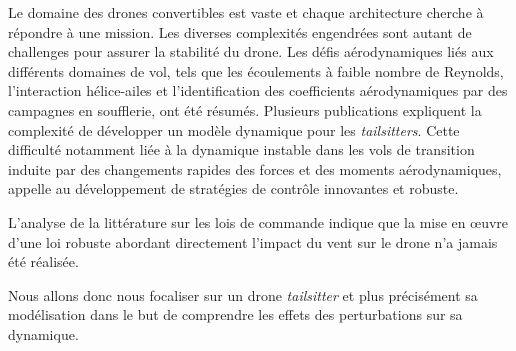 Le domaine des drones convertibles est vaste et chaque architecture cherche à répondre à une mission. Les diverses complexités engendrées sont autant de challenges pour assurer la stabilité du drone. Les défis aérodynamiques liés aux différents domaines de vol, tels que les écoulements à faible nombre de Reynolds, l'interaction hélice-ailes et l'identification des coefficients aérodynamiques par des campagnes en soufflerie, ont été résumés. Plusieurs publications expliquent la complexité de développer un modèle dynamique pour les \textit{tailsitters}. Cette difficulté notamment liée à la dynamique instable dans les vols de transition induite par des changements rapides des forces et des moments aérodynamiques, appelle au développement de stratégies de contrôle innovantes et robuste. 

L'analyse de la littérature sur les lois de commande indique que la mise en œuvre d'une loi robuste abordant directement l'impact du vent sur le drone n'a jamais été réalisée.

Nous allons donc nous focaliser sur un drone \textit{tailsitter} et plus précisément sa modélisation dans le but de comprendre les effets des perturbations sur sa dynamique.
